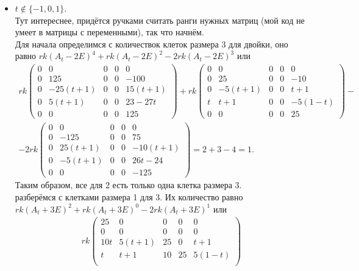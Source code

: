 \begin{itemize}
    \item $t \not\in \{-1, 0, 1\}$.\\
    Тут интереснее, придётся ручками считать ранги нужных матриц (мой код не умеет в матрицы с переменными), так что начнём.\\
    Для начала определимся с количествок клеток размера 3 для двойки, оно равно $rk(A_t - 2E)^4 + rk(A_t - 2E)^2 - 2rk(A_t - 2E)^3$ или
    \begin{gather*}
        rk \begin{pmatrix}
            0 & 0 & 0 & 0 & 0\\
            0 & 125 & 0 & 0 & -100\\
            0 & -25(t+1) & 0 & 0 & 15(t+1)\\
            0 & 5(t+1) & 0 & 0 & 23-27t\\
            0 & 0 & 0 & 0 & 125
        \end{pmatrix} + rk\begin{pmatrix}
            0 & 0 & 0 & 0 & 0\\
            0 & 25 & 0 & 0 & -10\\
            0 & -5(t+1) & 0 & 0 & t + 1\\
            t & t+1 & 0 & 0 & -5(1-t)\\
            0 & 0 & 0 & 0 & 25
        \end{pmatrix} - \\ - 2rk \begin{pmatrix}
            0 & 0 & 0 & 0 & 0\\
            0 & -125 & 0 & 0 & 75\\
            0 & 25(t+1) & 0 & 0 & -10(t+1)\\
            0 & -5(t+1) & 0 & 0 & 26t-24\\
            0 & 0 & 0 & 0 & -125
        \end{pmatrix} = 2 + 3 - 4 = 1.
    \end{gather*}
    Таким образом, все для 2 есть только одна клетка размера 3.\\
    разберёмся с клетками размера 1 для 3. Их количество равно $rk(A_t+3E)^2 + rk(A_t+3E)^0 - 2rk(A_t+3E)^1$ или
    \begin{gather*}
        rk \begin{pmatrix}
            25 & 0 & 0 & 0 & 0\\
            0 & 0 & 0 & 0 & 0\\
            10t & 5(t+1) & 25 & 0 & t+1\\
            t & t+1 & 10 & 25 & 5(1-t)\\

\end{pmatrix}
\end{gather*}
\end{itemize}
